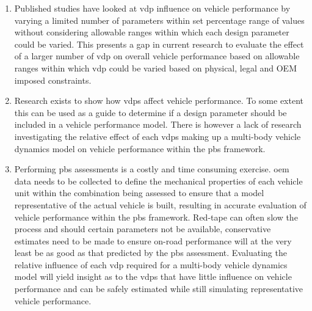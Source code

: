 \begin{enumerate}
\item Published studies have looked at \gls{vdp} influence on vehicle performance by varying a limited number of parameters within set percentage range of values without considering allowable ranges within which each design parameter could be varied. This presents a gap in current research to evaluate the effect of a larger number of \gls{vdp} on overall vehicle performance based on allowable ranges within which \gls{vdp} could be varied based on physical, legal and OEM imposed constraints.
\item Research exists to show how \glspl{vdp} affect vehicle performance. To some extent this can be used as a guide to determine if a design parameter should be included in a vehicle performance model. There is however a lack of research investigating the relative effect of each \glspl{vdp} making up a multi-body vehicle dynamics model on vehicle performance within the \gls{pbs} framework.
\item Performing \gls{pbs} assessments is a costly and time consuming exercise. \gls{oem} data needs to be collected to define the mechanical properties of each vehicle unit within the combination being assessed to ensure that a model representative of the actual vehicle is built, resulting in accurate evaluation of vehicle performance within the \gls{pbs} framework. Red-tape can often slow the process and should certain parameters not be available, conservative estimates need to be made to ensure on-road performance will at the very least be as good as that predicted by the \gls{pbs} assessment. Evaluating the relative influence of each \gls{vdp} required for a multi-body vehicle dynamics model will yield insight as to the \glspl{vdp} that have little influence on vehicle performance and can be safely estimated while still simulating representative vehicle performance.
\end{enumerate}